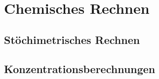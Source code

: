\section{Chemisches Rechnen}

\subsection{Stöchimetrisches Rechnen}

\subsection{Konzentrationsberechnungen}